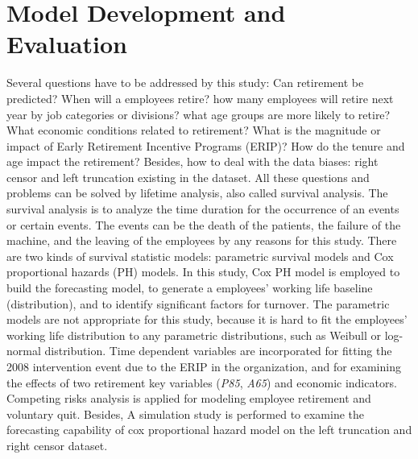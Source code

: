 \documentclass[12pt,letterpaper]{article}
\begin{document}
\section{Model Development and Evaluation}
Several questions have to be addressed by this study: Can retirement be predicted? When will a employees retire? how many employees will retire next year by job categories or divisions? what age groups are more likely to retire? What economic conditions related to retirement? What is the magnitude or impact of Early Retirement Incentive Programs (ERIP)? How do the tenure and age impact the retirement? Besides, how to deal with the data biases: right censor and left truncation existing in the dataset. All these questions and problems can be solved by lifetime analysis, also called survival analysis. The survival analysis is to analyze the time duration for the occurrence of an events or certain events. The events can be the death of the patients, the failure of the machine, and the leaving of the employees by any reasons for this study. There are two kinds of survival statistic models: parametric survival models and Cox proportional hazards (PH) models. In this study, Cox PH model is employed to build the forecasting model, to generate a employees' working life baseline (distribution), and to identify significant factors for turnover. The parametric models are not appropriate for this study, because it is hard to fit the employees' working life distribution to any parametric distributions, such as Weibull or log-normal distribution. Time dependent variables are incorporated for fitting the 2008 intervention event due to the ERIP in the organization, and for examining the effects of two retirement key variables ({\it P85}, {\it A65}) and economic indicators. Competing risks analysis is applied for modeling employee retirement and voluntary quit. Besides, A simulation study is performed to examine the forecasting capability of cox proportional hazard model on the left truncation and right censor dataset.
\end{document}
